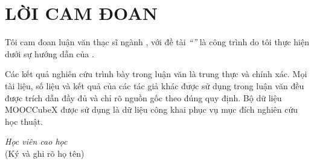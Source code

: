\chapter*{LỜI CAM ĐOAN}

\vspace{0.5cm}

Tôi cam đoan luận văn thạc sĩ ngành \nganh, với đề tài \textit{``\thesistitleshort''} là công trình do tôi thực hiện dưới sự hướng dẫn của \cbhd.

Các kết quả nghiên cứu trình bày trong luận văn là trung thực và chính xác. Mọi tài liệu, số liệu và kết quả của các tác giả khác được sử dụng trong luận văn đều được trích dẫn đầy đủ và chỉ rõ nguồn gốc theo đúng quy định. Bộ dữ liệu MOOCCubeX được sử dụng là dữ liệu công khai phục vụ mục đích nghiên cứu học thuật.

\vspace{1.5cm}

\begin{flushright}
\begin{minipage}{0.5\textwidth}
\centering
\textit{Học viên cao học}\\
(Ký và ghi rõ họ tên)\\[2.5cm]
\hvchname
\end{minipage}
\end{flushright}

\clearpage
